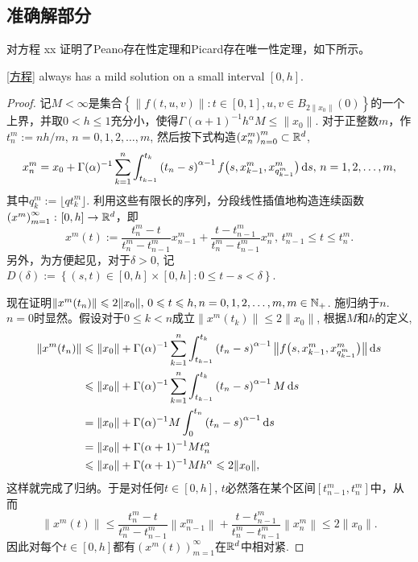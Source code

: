 \subsection{准确解部分}
对方程 xx 证明了Peano存在性定理和Picard存在唯一性定理，如下所示。
\begin{theorem}
    \cref{方程} always has a mild solution on a small interval $[0,h]$.
\end{theorem}
\begin{proof}
    记$M<\infty$是集合$\left\{\left\|f(t,u,v)\right\|\colon t\in [0,1], u,v\in B_{2\|x_0\|}(0)\right\}$的一个上界，并取$0<h\leqslant 1$充分小，使得$\Gamma(\alpha + 1)^{-1} h^\alpha M \leqslant \|x_0\|$. 对于正整数$m$，作$t^m_{n}:=nh/m,\,n=0,1,2,\dots,m$, 然后按下式构造$\left(x^m_{n}\right)_{n=0}^m\subset \mathbb{R}^d$,
    \begin{equation}\label{PicardSequence}
        x^m_{n}=x_0+\Gamma(\alpha)^{-1}\sum_{k=1}^n\int_{t_{k-1}}^{t_k}\left(t_n-s\right)^{\alpha-1}f\bigl(s,x^m_{k-1},x^m_{q^m_{k-1}}\bigr)\mathop{}\!\mathrm{d} s,\,n=1,2,\dots,m,
    \end{equation}
    其中$q^m_{k}:=\lfloor qt^m_k \rfloor$. 利用这些有限长的序列，分段线性插值地构造连续函数$\left(x^m\right)_{m=1}^\infty\colon[0,h]\to \mathbb{R}^d$，即
    \begin{equation*}
        x^m(t):=\frac{t^m_n-t}{t^m_n-t^m_{n-1}}x^m_{n-1}+\frac{t-t^m_{n-1}}{t^m_n-t^m_{n-1}}x^m_{n},\,t^m_{n-1}\leqslant t\leqslant t^m_n.
    \end{equation*}
    另外，为方便起见，对于$\delta>0$, 记$D(\delta):=\left\{(s,t)\in [0,h]\times [0,h]\colon 0\leqslant t-s<\delta\right\}$.

    现在证明$\|x^m(t_n)\|\leqslant 2\|x_0\|,\,0\leqslant t\leqslant h,n=0,1,2,\dots,m,m\in \mathbb{N_+}$. 施归纳于$n$. $n=0$时显然。假设对于$0\leqslant k<n$成立$\|x^m(t_k)\|\leqslant 2\|x_0\|$, 根据$M$和$h$的定义,
    \begin{align*}
        \left\|x^m(t_n)\right\|&\leqslant \|x_0\|+\Gamma(\alpha)^{-1}\sum_{k=1}^{n}\int_{t_{k-1}}^{t_k} \left(t_n-s\right)^{\alpha-1} \bigl\|f\bigl(s,x^m_{k-1},x^m_{q^m_{k-1}}\bigr)\bigr\| \mathop{}\!\mathrm{d} s
        \\ &\leqslant \|x_0\|+\Gamma(\alpha)^{-1} \sum_{k=1}^{n}\int_{t_{k-1}}^{t_k} \left(t_n-s\right)^{\alpha-1} M \mathop{}\!\mathrm{d} s
        \\ &= \|x_0\|+\Gamma(\alpha)^{-1} M \int_{0}^{t_n} \left(t_n-s\right)^{\alpha-1} \mathop{}\!\mathrm{d} s
        \\ &= \|x_0\|+\Gamma(\alpha+1)^{-1} M t_n^\alpha
        \\ &\leqslant \|x_0\|+\Gamma(\alpha+1)^{-1} M h^\alpha
        \leqslant 2\|x_0\|,
    \end{align*}
    这样就完成了归纳。于是对任何$t\in [0,h]$, $t$必然落在某个区间$\left[t^m_{n-1},t^m_n\right]$中，从而
    \begin{equation*}
        \left\|x^m(t)\right\|\leqslant \frac{t^m_n-t}{t^m_n-t^m_{n-1}}\left\|x^m_{n-1}\right\|+\frac{t-t^m_{n-1}}{t^m_n-t^m_{n-1}}\left\|x^m_{n}\right\|\leqslant 2\|x_0\|.
    \end{equation*}
    因此对每个$t\in [0,h]$都有$\left(x^m(t)\right)_{m=1}^\infty$在$\mathbb{R}^d$中相对紧.


\end{proof}
